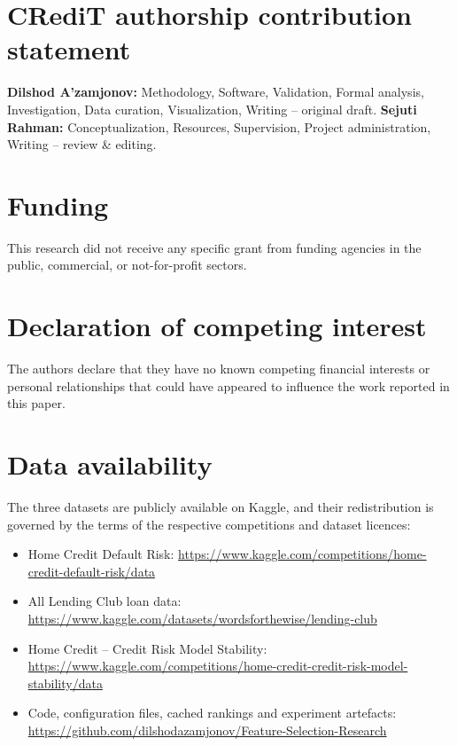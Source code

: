 \documentclass[final,5p,twocolumn]{elsarticle}
\begin{document}

\section*{CRediT authorship contribution statement}
\textbf{Dilshod A'zamjonov:} Methodology, Software, Validation, Formal analysis, Investigation, Data curation, Visualization, Writing -- original draft. \textbf{Sejuti Rahman:} Conceptualization, Resources, Supervision, Project administration, Writing -- review \& editing.

\section*{Funding}
This research did not receive any specific grant from funding agencies in the public, commercial, or not-for-profit sectors.

\section*{Declaration of competing interest}
The authors declare that they have no known competing financial interests or personal relationships that could have appeared to influence the work reported in this paper.

\section*{Data availability}
The three datasets are publicly available on Kaggle, and their redistribution is governed by the terms of the respective competitions and dataset licences:
\begin{itemize}
    \item Home Credit Default Risk: \url{https://www.kaggle.com/competitions/home-credit-default-risk/data}
    \item All Lending Club loan data: \url{https://www.kaggle.com/datasets/wordsforthewise/lending-club}
    \item Home Credit -- Credit Risk Model Stability: \url{https://www.kaggle.com/competitions/home-credit-credit-risk-model-stability/data}
    \item Code, configuration files, cached rankings and experiment artefacts: \url{https://github.com/dilshodazamjonov/Feature-Selection-Research}
\end{itemize}
\end{document}
